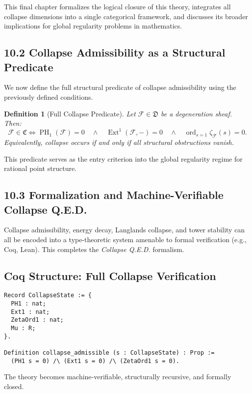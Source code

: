 \documentclass[11pt]{article}
\newtheorem{definition}[theorem]{Definition}
\DeclareMathOperator{\Ext}{Ext}
\DeclareMathOperator{\PH}{PH}
\newcommand{\ord}{\operatorname{ord}}
\begin{document}
This final chapter formalizes the logical closure of this theory, integrates all collapse dimensions into a single categorical framework, and discusses its broader implications for global regularity problems in mathematics.

\subsection*{10.2 Collapse Admissibility as a Structural Predicate}

We now define the full structural predicate of collapse admissibility using the previously defined conditions.

\begin{definition}[Full Collapse Predicate]
\label{def:collapse-predicate-final}
Let \( \mathcal{F} \in \mathfrak{D} \) be a degeneration sheaf. Then:
\[
\mathcal{F} \in \mathfrak{C} \iff 
\PH_1(\mathcal{F}) = 0 \quad \land \quad 
\Ext^1(\mathcal{F}, -) = 0 \quad \land \quad 
\ord_{s=1} \zeta_{\mathcal{F}}(s) = 0.
\]
Equivalently, collapse occurs if and only if all structural obstructions vanish.
\end{definition}

This predicate serves as the entry criterion into the global regularity regime for rational point structure.

\subsection*{10.3 Formalization and Machine-Verifiable Collapse Q.E.D.}

Collapse admissibility, energy decay, Langlands collapse, and tower stability can all be encoded into a type-theoretic system amenable to formal verification (e.g., Coq, Lean). This completes the \textit{Collapse Q.E.D.} formalism.

\subsection*{Coq Structure: Full Collapse Verification}
\begin{lstlisting}[language=Coq]
Record CollapseState := {
  PH1 : nat;
  Ext1 : nat;
  ZetaOrd1 : nat;
  Mu : R;
}.

Definition collapse_admissible (s : CollapseState) : Prop :=
  (PH1 s = 0) /\ (Ext1 s = 0) /\ (ZetaOrd1 s = 0).
\end{lstlisting}

The theory becomes machine-verifiable, structurally recursive, and formally closed.
\end{document}
